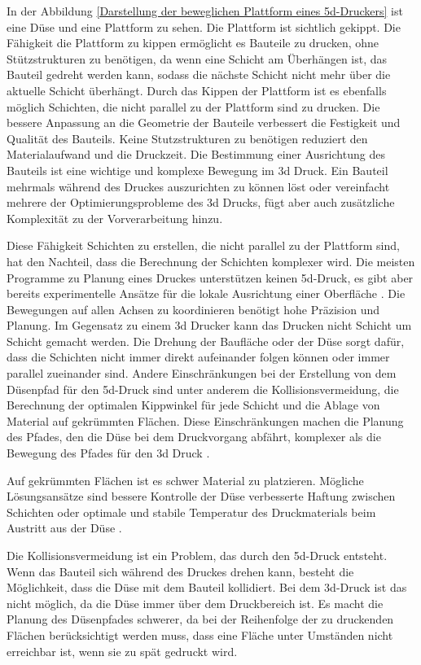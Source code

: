 In der Abbildung \ref{Darstellung der beweglichen Plattform eines 5d-Druckers} ist eine Düse und eine Plattform zu sehen. Die Plattform ist sichtlich gekippt. Die Fähigkeit die Plattform zu kippen ermöglicht es Bauteile zu drucken, ohne Stützstrukturen zu benötigen, 
da wenn eine Schicht am Überhängen ist, das Bauteil gedreht werden kann, sodass die nächste Schicht nicht mehr über die aktuelle Schicht überhängt. Durch das Kippen der Plattform ist es ebenfalls möglich Schichten, die nicht parallel zu der Plattform sind zu drucken.
Die bessere Anpassung an die Geometrie der Bauteile verbessert die Festigkeit und Qualität des Bauteils. Keine Stutzstrukturen zu benötigen reduziert den Materialaufwand und die Druckzeit. Die Bestimmung einer Ausrichtung des Bauteils ist eine wichtige und komplexe Bewegung im 3d Druck. 
Ein Bauteil mehrmals während des Druckes auszurichten zu können löst oder vereinfacht mehrere der Optimierungsprobleme des 3d Drucks, fügt aber auch zusätzliche Komplexität zu der Vorverarbeitung hinzu.

\smallskip

Diese Fähigkeit Schichten zu erstellen, die nicht parallel zu der Plattform sind, hat den Nachteil, dass die Berechnung der Schichten komplexer wird. Die meisten Programme zu Planung eines Druckes unterstützen keinen 5d-Druck, 
es gibt aber bereits experimentelle Ansätze für die lokale Ausrichtung einer Oberfläche \cite{haley2024review}.
Die Bewegungen auf allen Achsen zu koordinieren benötigt hohe Präzision und Planung. Im Gegensatz zu einem 3d Drucker kann das Drucken nicht Schicht um Schicht gemacht werden. Die Drehung der Baufläche oder der Düse sorgt dafür, 
dass die Schichten nicht immer direkt aufeinander folgen können oder immer parallel zueinander sind. 
Andere Einschränkungen bei der Erstellung von dem Düsenpfad für den 5d-Druck sind unter anderem die Kollisionsvermeidung, die Berechnung der optimalen Kippwinkel für jede Schicht und die Ablage von Material auf gekrümmten Flächen.
Diese Einschränkungen machen die Planung des Pfades, den die Düse bei dem Druckvorgang abfährt, komplexer als die Bewegung des Pfades für den 3d Druck \cite{kumar2026recent}.

\smallskip

Auf gekrümmten Flächen ist es schwer Material zu platzieren. Mögliche Lösungsansätze sind bessere Kontrolle der Düse verbesserte Haftung zwischen Schichten oder optimale und stabile Temperatur des Druckmaterials beim Austritt aus der Düse \cite{kumar2026recent}.

Die Kollisionsvermeidung ist ein Problem, das durch den 5d-Druck entsteht. Wenn das Bauteil sich während des Druckes drehen kann, besteht die Möglichkeit, dass die Düse mit dem Bauteil kollidiert. 
Bei dem 3d-Druck ist das nicht möglich, da die Düse immer über dem Druckbereich ist. Es macht die Planung des Düsenpfades schwerer, da bei der Reihenfolge der zu druckenden Flächen berücksichtigt werden muss, dass eine Fläche unter Umständen nicht erreichbar ist, 
wenn sie zu spät gedruckt wird.

